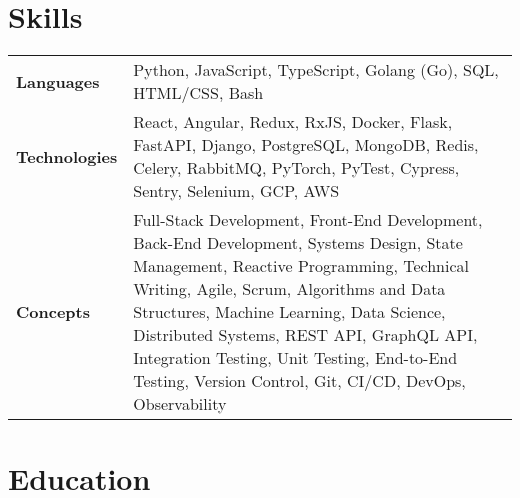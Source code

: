 \documentclass{ethan_cv}
\begin{document}
\section{Skills}
    \small
     \begin{tabular}{p{2.25cm} p{16cm}}
         \textbf{Languages} & Python, JavaScript, TypeScript, Golang (Go), SQL, HTML/CSS, Bash \\ 
         \textbf{Technologies} & React, Angular, Redux, RxJS, Docker, Flask, FastAPI, Django, PostgreSQL, MongoDB, Redis, Celery, RabbitMQ, PyTorch, PyTest, Cypress, Sentry, Selenium, GCP, AWS \\
         \textbf{Concepts} & Full-Stack Development, Front-End Development, Back-End Development, Systems Design, State Management, Reactive Programming, Technical Writing, Agile, Scrum, Algorithms and Data Structures, Machine Learning, Data Science, Distributed Systems, REST API, GraphQL API, Integration Testing, Unit Testing, End-to-End Testing, Version Control, Git, CI/CD, DevOps, Observability
     \end{tabular}
     \vspace{+3mm}


\section{Education}
\end{document}
